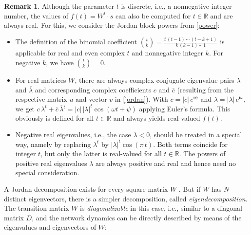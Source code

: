 \documentclass{sn-jnl}
\theoremstyle{definition}
\newtheorem{remk}{Remark}
\begin{document}
\begin{remk}\label{general}
Although the parameter $t$ is discrete, i.e., a nonnegative integer number, the
values of $f(t) = W^t \cdot s$ can also be computed for $t \in \mathbb{R}$ and
are always real. For this, we consider the Jordan block powers from \cref{power}:
\begin{itemize}
  \item The definition of the binomial coefficient $\binom{t}{k} =
	\frac{t\,(t-1)\,\cdots\,(t-k+1)}{k\,(k-1)\,\cdots\,1}$ is applicable for
	real and even complex $t$ and nonnegative integer $k$. For negative $k$,
	we have $\binom{t}{k} = 0$.
  \item For real matrices $W$, there are always complex conjugate eigenvalue
	pairs $\lambda$ and $\overline{\lambda}$ and corresponding complex
	coefficients $c$ and $\overline{c}$ (resulting from the respective matrix $u$ and vector $v$ in
	\cref{jordan}). With $c = |c|\,e^{\mathfrak{i}\psi}$ and
	$\lambda = |\lambda|\,e^{\mathfrak{i}\omega}$, we get $c\,\lambda^t +
	\overline{c}\,\overline{\lambda}{}^t = |c|\,|\lambda|^t \cos(\omega
	t+\psi)$ applying Euler's formula. This obviously is defined for all
	$t \in \mathbb{R}$ and always yields real-valued $f(t)$.
  \item Negative real eigenvalues, i.e., the case $\lambda<0$, should be treated
	in a special way, namely by replacing $\lambda^t$ by $|\lambda|^t \cos(\pi\,t)$.
	Both terms coincide for integer $t$, but only the latter is real-valued
	for all $t \in \mathbb{R}$. The powers of positive real eigenvalues
	$\lambda$ are always positive and real and hence need no special consideration.
\end{itemize}
\end{remk}

A Jordan decomposition exists for every square matrix $W$ \citep[Theorem~3.1.11]{HJ13}.
But if $W$ has $N$ distinct eigenvectors, there is a simpler decomposition,
called \emph{eigendecomposition}. The transition matrix $W$ is
\emph{diagonalizable} in this case, i.e., similar to a diagonal matrix $D$, and
the network dynamics can be directly described by means of the eigenvalues and
eigenvectors of $W$:
\end{document}
